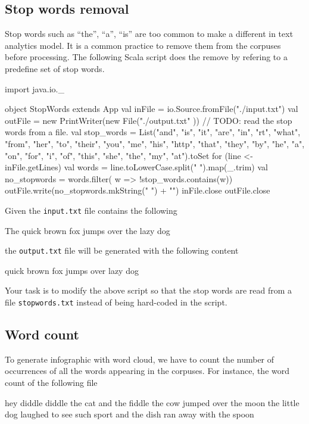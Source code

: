 \documentclass[10pt]{article}
\begin{document}
\subsection{Stop words removal}
Stop words such as ``the'', ``a'', ``is'' are too common to make a
different in text analytics model. It is a common practice to remove
them from the corpuses before processing. The following Scala script
does the remove by refering to a predefine set of stop words.
\begin{code}
import java.io._

object StopWords extends App {
  val inFile = io.Source.fromFile("./input.txt")
  val outFile = new PrintWriter(new File("./output.txt" ))
  // TODO: read the stop words from a file.
  val stop_words = List("and", "is", "it", "are", "in", "rt", "what", "from",
                "her", "to", "their", "you", "me", "his", "http", "that", "they", "by",
                "he", "a", "on", "for", "i", "of", "this", "she", "the", "my", "at").toSet
  for (line <- inFile.getLines) {
    val words = line.toLowerCase.split(" ").map(_.trim)
    val no_stopwords = words.filter( w => !stop_words.contains(w))
    outFile.write(no_stopwords.mkString(" ") + "\n")
  }
  inFile.close
  outFile.close
}
\end{code} 
%
Given the {\tt input.txt} file contains the following 
\begin{code}
The quick brown fox jumps over the lazy dog
\end{code}
the {\tt output.txt} file will be generated with the following content
\begin{code}
quick brown fox jumps over lazy dog
\end{code}

Your task is to modify the above script so that the stop words are
read from a file {\tt stopwords.txt} instead of being hard-coded in
the script. 

\subsection{Word count}
To generate infographic with word cloud, we have to count the number
of occurrences of all the words appearing in the corpuses.  For
instance, the word count of the following file
\begin{code}
hey diddle diddle
the cat and the fiddle
the cow jumped over the
 moon
the little dog laughed
to see such sport
and the dish ran away
 with the spoon
\end{code}
\end{document}
